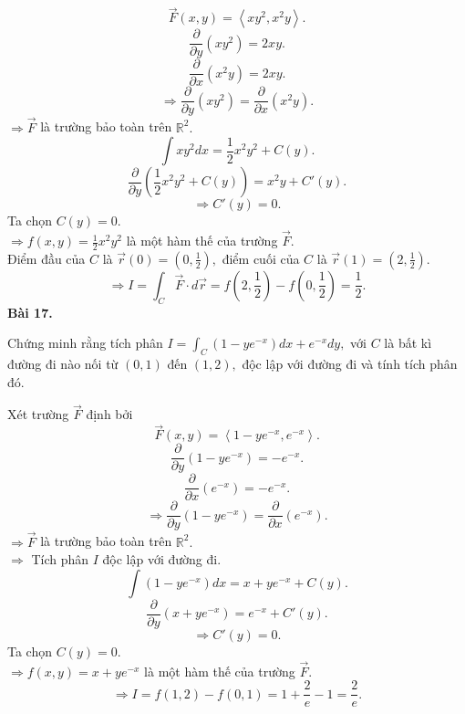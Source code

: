 \documentclass[12pt,a4paper]{article}
\begin{document}
\[\overrightarrow{F}\left( {x,y} \right) = \left\langle {x{y^2},{x^2}y} \right\rangle .\]
\[\frac{\partial }{{\partial y}}\left( {x{y^2}} \right) = 2xy.\]
\[\frac{\partial }{{\partial x}}\left( {{x^2}y} \right) = 2xy.\]
\[ \Rightarrow \frac{\partial }{{\partial y}}\left( {x{y^2}} \right) = \frac{\partial }{{\partial x}}\left( {{x^2}y} \right).\]
\( \Rightarrow \overrightarrow F \) là trường bảo toàn trên \(\mathbb{R}^2.\)
\[\int {x{y^2}dx}  = \frac{1}{2}{x^2}{y^2} + C\left( y \right).\]
\[\frac{\partial }{{\partial y}}\left( {\frac{1}{2}{x^2}{y^2} + C\left( y \right)} \right) = {x^2}y + C'\left( y \right).\]
\[ \Rightarrow C'\left( y \right) = 0.\]
Ta chọn \(C\left( y \right) = 0.\)\\
\( \Rightarrow f\left( {x,y} \right) = \frac{1}{2}{x^2}{y^2}\) là một hàm thế của trường \(\overrightarrow{F}.\)\\
Điểm đầu của \(C\) là \(\overrightarrow r \left( 0 \right) = \left( {0,\frac{1}{2}} \right),\) điểm cuối của \(C\) là  \(\overrightarrow r \left( 1 \right) = \left( {2,\frac{1}{2}} \right).\)
\[ \Rightarrow I = \int_C {\overrightarrow F  \cdot d\overrightarrow r }  = f\left( {2,\frac{1}{2}} \right) - f\left( {0,\frac{1}{2}} \right) = \frac{1}{2}.\]
\textbf{Bài 17.}
\begin{mybox}
Chứng minh rằng tích phân \(I = \int_C {\left( {1 - y{e^{ - x}}} \right)dx + {e^{ - x}}dy}, \) với \(C\) là bất kì đường đi nào nối từ \(\left( {0,1} \right)\) đến \(\left( {1,2} \right),\) độc lập với đường đi và tính tích phân đó.
\end{mybox}
Xét trường \(\overrightarrow{F}\) định bởi
\[\overrightarrow F \left( {x,y} \right) = \left\langle {1 - y{e^{ - x}},{e^{ - x}}} \right\rangle .\]
\[\frac{\partial }{{\partial y}}\left( {1 - y{e^{ - x}}} \right) =  - {e^{ - x}}.\]
\[\frac{\partial }{{\partial x}}\left( {{e^{ - x}}} \right) =  - {e^{ - x}}.\]
\[ \Rightarrow \frac{\partial }{{\partial y}}\left( {1 - y{e^{ - x}}} \right) = \frac{\partial }{{\partial x}}\left( {{e^{ - x}}} \right).\]
\( \Rightarrow \overrightarrow F \) là trường bảo toàn trên \(\mathbb{R}^2.\)\\
\( \Rightarrow \) Tích phân \(I\) độc lập với đường đi.
\[\int {\left( {1 - y{e^{ - x}}} \right)dx}  = x + y{e^{ - x}} + C\left( y \right).\]
\[\frac{\partial }{{\partial y}}\left( {x + y{e^{ - x}}} \right) = {e^{ - x}} + C'\left( y \right).\]
\[ \Rightarrow C'\left( y \right) = 0.\]
Ta chọn \(C\left( y \right) = 0.\)\\
\( \Rightarrow f\left( {x,y} \right) = x + y{e^{ - x}}\) là một hàm thế của trường \(\overrightarrow{F}.\)
\[ \Rightarrow I = f\left( {1,2} \right) - f\left( {0,1} \right) = 1 + \frac{2}{e} - 1 = \frac{2}{e}.\]
\end{document}
